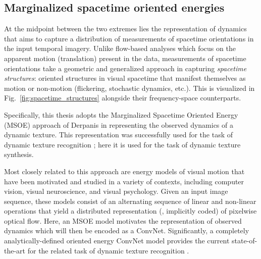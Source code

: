 \subsection{Marginalized spacetime oriented energies}
\label{sec:msoe}

At the midpoint between the two extremes lies the representation of dynamics that aims to capture a distribution of measurements of spacetime orientations in the input temporal imagery. Unlike flow-based analyses which focus on the apparent motion (\ie translation) present in the data, measurements of spacetime orientations take a geometric and generalized approach in capturing \emph{spacetime structures}: oriented structures in visual spacetime that manifest themselves as motion or non-motion (\eg flickering, stochastic dynamics, etc.). This is visualized in Fig.\ \ref{fig:spacetime_structures} alongside their frequency-space counterparts. 
\clearpage

\clearpage

Specifically, this thesis adopts the Marginalized Spacetime Oriented Energy (MSOE) approach of Derpanis \etal \cite{derpanis2010role,derpanis2012spacetime} in representing the observed dynamics of a dynamic texture. This representation was successfully used for the task of dynamic texture recognition \cite{derpanis2012spacetime}; here it is used for the task of dynamic texture synthesis.

Most closely related to this approach are energy models of visual
motion \cite{adelson1985spatiotemporal,heeger1988,simoncelli1998,nishimoto2011,derpanis2012spacetime,konda2014}
that have been motivated and studied in a variety of contexts,
including computer vision, visual neuroscience, and visual
psychology.
Given an input image sequence, these models consist of an
alternating sequence of linear and non-linear operations that yield
a distributed representation (\ie,  implicitly coded) of pixelwise
optical flow.
Here, an MSOE model motivates the
representation of observed dynamics which will then be encoded
as a ConvNet. Significantly, a completely analytically-defined
oriented energy ConvNet model provides the current state-of-the-art
for the related task of dynamic texture recognition \cite{hadji2017}.


